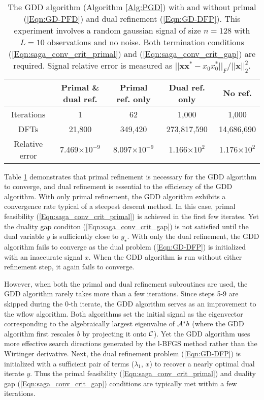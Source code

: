 \begin{table}[H]
\centering
\begin{tabular}{ |c|c|c|c|c| }
 \hline
	& Primal \& dual ref.
 			& Primal ref. only  &	Dual ref. only & No ref. \\
 \hline
 Iterations 		& 1	&  62 	&	1,000	&  1,000	\\
 DFTs 	& 21,800 	& 349,420 &	 273,817,590 	&  14,686,690	\\
 Relative error & 	7.469$\times 10^{-9}$		&	8.097$\times 10^{-9}$ &	1.166$\times 10^{2}$	& 	 1.176$\times 10^{2}$	\\
 \hline
\end{tabular}
\vspace{0.5cm}
\caption{The GDD algorithm (Algorithm \ref{Alg:PGD}) with and without primal (\ref{Eqn:GD-PFD}) and dual refinement (\ref{Eqn:GD-DFP}). This experiment involves a random gaussian signal of size $n = 128$ with $L = 10$ observations and no noise.  Both termination conditions (\ref{Eqn:saga_conv_crit_primal}) and (\ref{Eqn:saga_conv_crit_gap}) are required.  Signal relative error is measured as $|| \mathbf{x}\mathbf{x}^*-x_0x_0^* ||_F / ||\mathbf{x}||_2^2$.} 
\label{Tab:noiseless_runtimes}
\end{table}


Table \ref{Tab:noiseless_runtimes} demonstrates that primal refinement is necessary for the GDD algorithm to converge, and dual refinement is essential to the efficiency of the GDD algorithm.  With only primal refinement, the GDD algorithm exhibits a convergence rate typical of a steepest descent method.   In this case, primal feasibility (\ref{Eqn:saga_conv_crit_primal}) is achieved in the first few iterates.  Yet the duality gap conditon (\ref{Eqn:saga_conv_crit_gap}) is not satisfied until the dual variable $y$ is sufficiently close to $y_\star$.  With only the dual refinement, the GDD algorithm fails to converge as the dual problem (\ref{Eqn:GD-DFP}) is initialized with an inaccurate signal $x$.  When the GDD algorithm is run without either refinement step, it again fails to converge.  


However, when both the primal and dual refinement subroutines are used, the GDD algorithm rarely takes more than a few iterations.  Since steps 5-9 are skipped during the $0$-th iterate, the GDD algorithm serves as an improvement to the wflow algorithm.  
Both algorithms set the initial signal as the eigenvector corresponding to the algebraically largest eigenvalue of ${\mathcal A}^*b$ (where the GDD algorithm first rescales $b$ by projecting it onto ${\mathcal C}$).  
Yet the GDD algorithm uses more effective search directions generated by the l-BFGS method rather than the Wirtinger derivative.  Next, the dual refinement problem (\ref{Eqn:GD-DFP}) is initialized with a sufficient pair of terms ($\lambda_1$, $x$) to recover a nearly optimal dual iterate $y$.  Thus the primal feasibility (\ref{Eqn:saga_conv_crit_primal}) and duality gap (\ref{Eqn:saga_conv_crit_gap}) conditions are typically met within a few iterations.  



